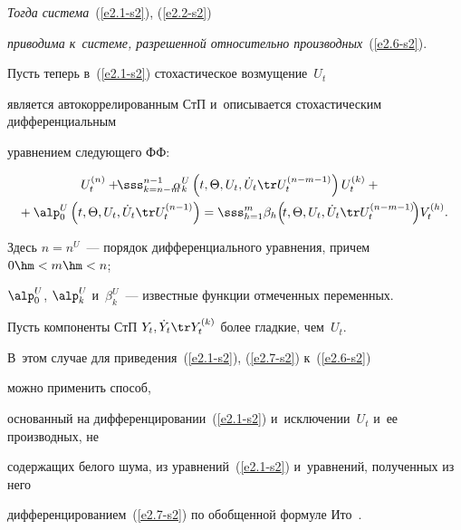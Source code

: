 \textit{Тогда система}~(\ref{e2.1-s2}), (\ref{e2.2-s2}) 

\textit{приводима к~системе, разрешенной относительно производных}~(\ref{e2.6-s2}).



\smallskip





Пусть теперь в~(\ref{e2.1-s2}) стохастическое возмущение~$U_t$ 

является автокоррелированным СтП и~описывается стохастическим дифференциальным 

уравнением следующего ФФ:



\noindent

\begin{multline}

\!\!\!\!U_t^{(n)} + \!\!\sss_{k=n-m}^{n-1}\hspace*{-2mm}\alpha_k^U \left(t, \Theta, U_t, 

    \dot U_t \tr U_t^{(n-m-1)}\right) U_t^{(k)} +{}\\

    \!\!\!\!{}+ \alp_0^U 

    \left(t, \Theta, U_t, \dot U_t \tr U_t^{(n-1)}\right) =

     \sss_{h=1}^m \beta_h \!\left(\!t, \Theta, U_t, \dot U_t \tr U_t^{(n-m-1)}\!\right)\!

V_t^{(h)}.\!\!\label{e2.7-s2}

\end{multline}

Здесь $n=n^U$~--- порядок дифференциального уравнения, причем $0\hm<m\hm<n$; 

$\alp_0^U$, $\alp_k^U$ и~$\beta_k^U$~--- известные функции отмеченных переменных.



Пусть компоненты СтП $Y_t, \dot Y_t\tr Y_t^{(k)}$ более гладкие, чем~$U_t$. 

В~этом случае для приведения~(\ref{e2.1-s2}), (\ref{e2.7-s2}) к~(\ref{e2.6-s2}) 

можно применить способ, 

основанный на дифференцировании~(\ref{e2.1-s2}) и~исключении~$U_t$ и~ее производных, не 

содержащих белого шума, из уравнений~(\ref{e2.1-s2}) и~уравнений, полученных из него 

дифференцированием~(\ref{e2.7-s2}) по обобщенной формуле Ито~\cite{1-s2, 2-s2}. 

